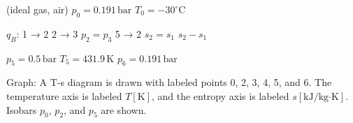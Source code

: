 (ideal gas, air)  
\( p_0 = 0.191 \, \text{bar} \)  
\( T_0 = -30^\circ \text{C} \)  

\( q_B \):  
1 → 2  
2 → 3  
\( p_2 = p_3 \)  
5 → 2  
\( s_2 = s_1 \)  
\( s_2 - s_1 \)  

\( p_5 = 0.5 \, \text{bar} \)  
\( T_5 = 431.9 \, \text{K} \)  
\( p_6 = 0.191 \, \text{bar} \)  

Graph:  
A T-s diagram is drawn with labeled points 0, 2, 3, 4, 5, and 6.  
The temperature axis is labeled \( T [\text{K}] \), and the entropy axis is labeled \( s [\text{kJ/kg·K}] \).  
Isobars \( p_0 \), \( p_2 \), and \( p_5 \) are shown.